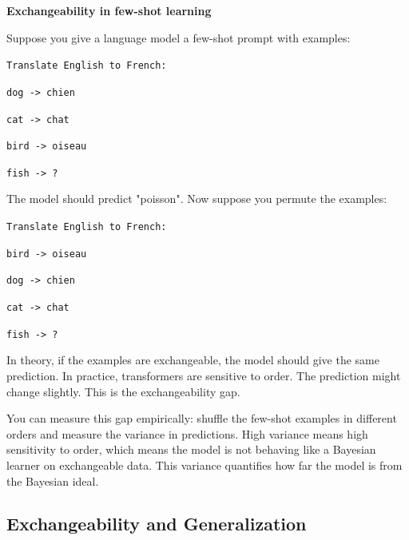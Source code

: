 \vspace{1.5em}

\begin{examplebox}
\textbf{Exchangeability in few-shot learning}

\vspace{0.5em}

Suppose you give a language model a few-shot prompt with examples:

\vspace{0.5em}

\texttt{Translate English to French:}

\texttt{dog -> chien}

\texttt{cat -> chat}

\texttt{bird -> oiseau}

\texttt{fish -> ?}

\vspace{0.5em}

The model should predict "poisson". Now suppose you permute the examples:

\vspace{0.5em}

\texttt{Translate English to French:}

\texttt{bird -> oiseau}

\texttt{dog -> chien}

\texttt{cat -> chat}

\texttt{fish -> ?}

\vspace{0.5em}

In theory, if the examples are exchangeable, the model should give the same prediction. In practice, transformers are sensitive to order. The prediction might change slightly. This is the exchangeability gap.

\vspace{0.5em}

You can measure this gap empirically: shuffle the few-shot examples in different orders and measure the variance in predictions. High variance means high sensitivity to order, which means the model is not behaving like a Bayesian learner on exchangeable data. This variance quantifies how far the model is from the Bayesian ideal.
\end{examplebox}

\vspace{1.5em}

\subsection{Exchangeability and Generalization}

